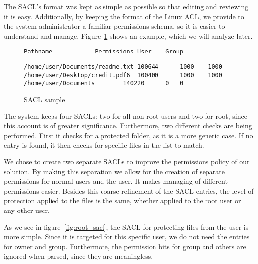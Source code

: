 \par The \ac{SACL}'s format was kept as simple as possible so that editing and reviewing it is easy. Additionally, by keeping the format of the Linux \ac{ACL}, we provide to the system administrator a familiar permissions schema, so it is easier to understand and manage. Figure~\ref{fig:sacl} shows an example, which we will analyze later.

\begin{figure}[ht]
	\centering
	\begin{lstlisting}
Pathname			Permissions	User	Group
	\end{lstlisting}
	\footnotesize{\selectfont 
	\begin{lstlisting}
/home/user/Documents/readme.txt	100644		1000	1000
/home/user/Desktop/credit.pdf6	100400		1000	1000
/home/user/Documents		140220		0	0
	\end{lstlisting}}
	\caption{\ac{SACL} sample}
	\label{fig:sacl}
\end{figure}

\par The system keeps four \acp{SACL}: two for all non-root users and two for root, since this account is of greater significance. Furthermore, two different checks are being performed. First it checks for a protected folder, as it is a more generic case. If no entry is found, it then checks for specific files in the list to match. 

\par We chose to create two separate \acp{SACL} to improve the permissions policy of our solution. By making this separation we allow for the creation of separate permissions for normal users and the  user. It makes managing of different permissions easier. 
Besides this coarse refinement of the \ac{SACL} entries, the level of protection applied to the files is the same, whether applied to the root user or any other user.

\par As we see in figure~\ref{fig:root_sacl}, the \ac{SACL} for protecting files from the  user is more simple. Since it is targeted for this specific user, we do not need the entries for owner and group. Furthermore, the permission bits for group and others are ignored when parsed, since they are meaningless.

